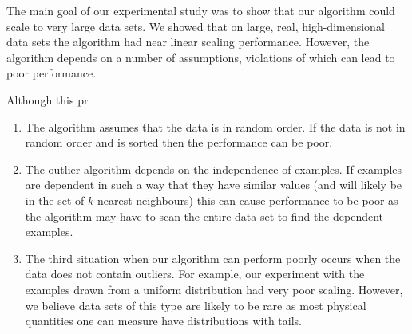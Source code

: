The main goal of our experimental study was to show that our algorithm could
scale to very large data sets. We showed that on large, real, high-dimensional
data sets the algorithm had near linear scaling performance. However, the
algorithm depends on a number of assumptions, violations of which can lead to
poor performance.

Although this pr

\begin{enumerate}
    \item The algorithm assumes that the data is in random order. If the data is
        not in random order and is sorted then the performance can be poor.
    \item The outlier algorithm depends on the independence of examples. If
        examples are dependent in such a way that they have similar values (and
        will likely be in the set of $k$ nearest neighbours) this can cause
        performance to be poor as the algorithm may have to scan the entire data
        set to find the dependent examples.
    \item The third situation when our algorithm can perform poorly occurs when
        the data does not contain outliers. For example, our experiment with the
        examples drawn from a uniform distribution had very poor scaling.
        However, we believe data sets of this type are likely to be rare as most
        physical quantities one can measure have distributions with tails.
\end{enumerate}
